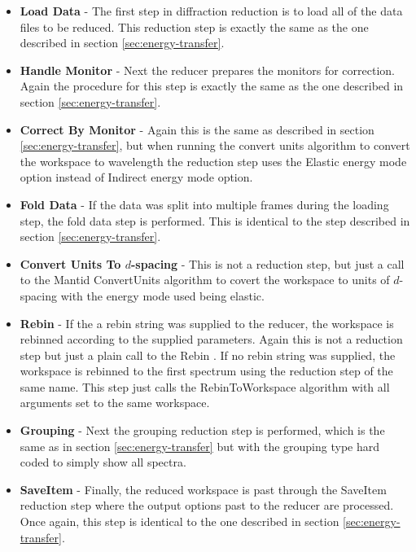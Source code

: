 \documentclass[paper=a4, fontsize=11pt]{scrartcl}	%
\numberwithin{equation}{section}															%
\numberwithin{figure}{section}																%
\numberwithin{table}{section}																%
\begin{document}
\begin{itemize}
\item \textbf{Load Data} - The first step in diffraction reduction is to load all of the data files to be reduced. This reduction step is exactly the same as the one described in section \ref{sec:energy-transfer}.

\item \textbf{Handle Monitor} - Next the reducer prepares the monitors for correction. Again the procedure for this step is exactly the same as the one described in section \ref{sec:energy-transfer}.

\item \textbf{Correct By Monitor} - Again this is the same as described in section \ref{sec:energy-transfer}, but when running the convert units algorithm to convert the workspace to wavelength the reduction step uses the Elastic energy mode option instead of Indirect energy mode option.

\item \textbf{Fold Data} - If the data was split into multiple frames during the loading step, the fold data step is performed. This is identical to the step described in section \ref{sec:energy-transfer}.

\item \textbf{Convert Units To $d$-spacing} - This is not a reduction step, but just a call to the Mantid ConvertUnits algorithm to covert the workspace to units of $d$-spacing with the energy mode used being elastic.

\item \textbf{Rebin} - If the a rebin string was supplied to the reducer, the workspace is rebinned according to the supplied parameters. Again this is not a reduction step but just a plain call to the Rebin . If no rebin string was supplied, the workspace is rebinned to the first spectrum using the reduction step of the same name. This step just calls the RebinToWorkspace algorithm with all arguments set to the same workspace.

\item \textbf{Grouping} - Next the grouping reduction step is performed, which is the same as in section \ref{sec:energy-transfer} but with the grouping type hard coded to simply show all spectra.

\item \textbf{SaveItem} - Finally, the reduced workspace is past through the SaveItem reduction step where the output options past to the reducer are processed. Once again, this step is identical to the one described in section \ref{sec:energy-transfer}.

\end{itemize}
\end{document}
